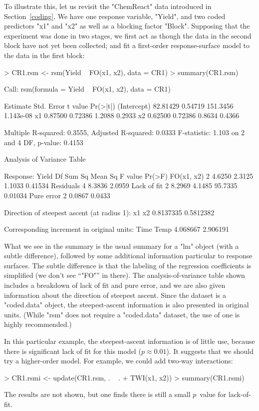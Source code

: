\documentclass[article,nojss]{jss}
\def\Sect#1{Section~\ref{#1}}
\begin{document}
To illustrate this, let us revisit the "ChemReact" data introduced in \Sect{coding}.  We have one response variable, "Yield", and two coded predictors "x1" and "x2" as well as a blocking factor "Block".  Supposing that the experiment was done in two stages, we first act as though the data in the second block have not yet been collected; and fit a first-order response-surface model to the data in the first block:
\begin{Schunk}
\begin{Sinput}
> CR1.rsm <- rsm(Yield ~ FO(x1, x2), data = CR1)
> summary(CR1.rsm)
\end{Sinput}
\begin{Soutput}
Call:
rsm(formula = Yield ~ FO(x1, x2), data = CR1)

            Estimate Std. Error  t value  Pr(>|t|)
(Intercept) 82.81429    0.54719 151.3456 1.143e-08
x1           0.87500    0.72386   1.2088    0.2933
x2           0.62500    0.72386   0.8634    0.4366

Multiple R-squared:  0.3555,	Adjusted R-squared:  0.0333 
F-statistic: 1.103 on 2 and 4 DF,  p-value: 0.4153

Analysis of Variance Table

Response: Yield
            Df Sum Sq Mean Sq F value  Pr(>F)
FO(x1, x2)   2 4.6250  2.3125  1.1033 0.41534
Residuals    4 8.3836  2.0959                
Lack of fit  2 8.2969  4.1485 95.7335 0.01034
Pure error   2 0.0867  0.0433                

Direction of steepest ascent (at radius 1):
       x1        x2 
0.8137335 0.5812382 

Corresponding increment in original units:
    Time     Temp 
4.068667 2.906191 
\end{Soutput}
\end{Schunk}
What we see in the summary is the usual summary for a "lm" object (with a subtle difference), followed by some additional information particular to response surfaces.  The subtle difference is that the labeling of the regression coefficients is simplified (we don't see ``"FO"'' in there).  The analysis-of-variance table shown includes a breakdown of lack of fit and pure error, and we are also given information about the direction of steepest ascent.  Since the dataset is a "coded.data" object, the steepest-ascent information is also presented in original units.  (While "rsm" does not require a "coded.data" dataset, the use of one is highly recommended.)

In this particular example, the steepest-ascent information is of little use, because there is significant
lack of fit for this model ($p \approx 0.01$).  It suggests that we should try a higher-order model.  For example, we could add two-way interactions:
\begin{Schunk}
\begin{Sinput}
> CR1.rsmi <- update(CR1.rsm, . ~ . + TWI(x1, x2))
> summary(CR1.rsmi)
\end{Sinput}
\end{Schunk}
The results are not shown, but one finds there is still a small $p$~value for lack-of-fit.  
\end{document}
